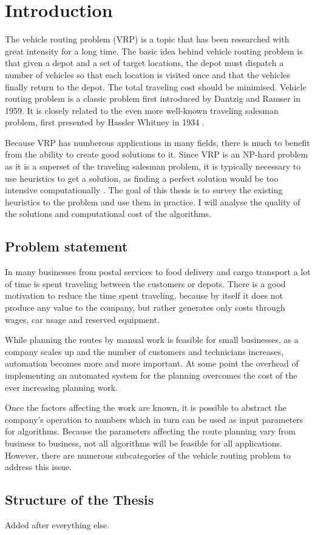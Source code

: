 \chapter{Introduction}
\label{chapter:intro}

The vehicle routing problem (VRP) is a topic that has been researched with great intensity for a long time. The basic idea behind vehicle routing problem is that given a depot and a set of target locations, the depot must dispatch a number of vehicles so that each location is visited once and that the vehicles finally return to the depot. The total traveling cost should be minimised. Vehicle routing problem is a classic problem first introduced by Dantzig and Ramser in 1959. \cite{dantzig1959truck} It is closely related to the even more well-known traveling salesman problem, first presented by Hassler Whitney in 1934 \cite{flood1956traveling}. 

Because VRP has numberous applications in many fields, there is much to benefit from the ability to create good solutions to it. Since VRP is an NP-hard problem as it is a superset of the traveling salesman problem, it is typically necessary to use heuristics to get a solution, as finding a perfect solution would be too intensive computationally \cite{laporte2007you}. The goal of this thesis is to survey the existing heuristics to the problem and use them in practice. I will analyse the quality of the solutions and computational cost of the algorithms.  

\section{Problem statement} 
In many businesses from postal services to food delivery and cargo transport a lot of time is spent traveling between the customers or depots. There is a good motivation to reduce the time spent traveling, because by itself it does not produce any value to the company, but rather generates only costs through wages, car usage and reserved equipment.  

While planning the routes by manual work is feasible for small businesses, as a company scales up and the number of customers and technicians increases, automation becomes more and more important. At some point the overhead of implementing an automated system for the planning overcomes the cost of the ever increasing planning work. 

Once the factors affecting the work are known, it is possible to abstract the company's operation to numbers which in turn can be used as input parameters for algorithms. Because the parameters affecting the route planning vary from business to business, not all algorithms will be feasible for all applications. However, there are numerous subcategories of the vehicle routing problem to address this issue.

\section{Structure of the Thesis}
Added after everything else.